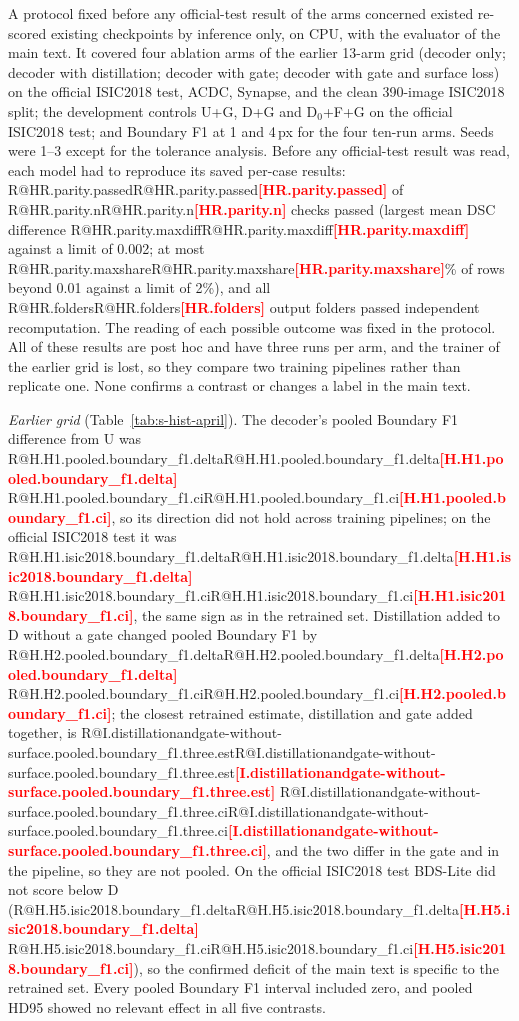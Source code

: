 \documentclass[10pt]{article}
\makeatletter
\newcommand{\R}[1]{\ifcsname R@#1\endcsname\csname R@#1\endcsname\else\textbf{\textcolor{red}{[#1]}}\fi}
\renewcommand\paragraph{\@startsection{paragraph}{4}{\z@}{1.6ex \@plus .5ex \@minus .2ex}{-1em}{\normalfont\normalsize\bfseries}}
\newcommand{\fitwidth}[1]{\sbox{\fitbox}{#1}\ifdim\wd\fitbox>\linewidth\resizebox{\linewidth}{!}{\usebox{\fitbox}}\else\usebox{\fitbox}\fi}
\makeatother
\begin{document}
\paragraph{Historical re-evaluation.} A protocol fixed before any official-test result of the arms concerned existed re-scored existing checkpoints by inference only, on CPU, with the evaluator of the main text. It covered four ablation arms of the earlier 13-arm grid (decoder only; decoder with distillation; decoder with gate; decoder with gate and surface loss) on the official ISIC2018 test, ACDC, Synapse, and the clean 390-image ISIC2018 split; the development controls U+G, D+G and D$_0$+F+G on the official ISIC2018 test; and Boundary F1 at 1 and 4\,px for the four ten-run arms. Seeds were 1--3 except for the tolerance analysis. Before any official-test result was read, each model had to reproduce its saved per-case results: \R{HR.parity.passed} of \R{HR.parity.n} checks passed (largest mean DSC difference \R{HR.parity.maxdiff} against a limit of 0.002; at most \R{HR.parity.maxshare}\% of rows beyond 0.01 against a limit of 2\%), and all \R{HR.folders} output folders passed independent recomputation. The reading of each possible outcome was fixed in the protocol. All of these results are post hoc and have three runs per arm, and the trainer of the earlier grid is lost, so they compare two training pipelines rather than replicate one. None confirms a contrast or changes a label in the main text.

\emph{Earlier grid} (Table~\ref{tab:s-hist-april}). The decoder's pooled Boundary F1 difference from U was \R{H.H1.pooled.boundary_f1.delta} \R{H.H1.pooled.boundary_f1.ci}, so its direction did not hold across training pipelines; on the official ISIC2018 test it was \R{H.H1.isic2018.boundary_f1.delta} \R{H.H1.isic2018.boundary_f1.ci}, the same sign as in the retrained set. Distillation added to D without a gate changed pooled Boundary F1 by \R{H.H2.pooled.boundary_f1.delta} \R{H.H2.pooled.boundary_f1.ci}; the closest retrained estimate, distillation and gate added together, is \R{I.distillationandgate-without-surface.pooled.boundary_f1.three.est} \R{I.distillationandgate-without-surface.pooled.boundary_f1.three.ci}, and the two differ in the gate and in the pipeline, so they are not pooled. On the official ISIC2018 test BDS-Lite did not score below D (\R{H.H5.isic2018.boundary_f1.delta} \R{H.H5.isic2018.boundary_f1.ci}), so the confirmed deficit of the main text is specific to the retrained set. Every pooled Boundary F1 interval included zero, and pooled HD95 showed no relevant effect in all five contrasts.
\begin{table}[!htbp]\centering\scriptsize
\fitwidth{}
\caption{\label{tab:s-hist-april}Earlier 13-arm grid re-evaluated post hoc: Boundary F1 differences with 95\% intervals, seeds 1--3. Pooled over the official ISIC2018 test, ACDC, and Synapse by inverse variance; the clean 390-image split is a sensitivity column and is not pooled. Holm over the five contrasts within each metric; no pooled Boundary F1 contrast passed.}
\end{table}
\end{document}
